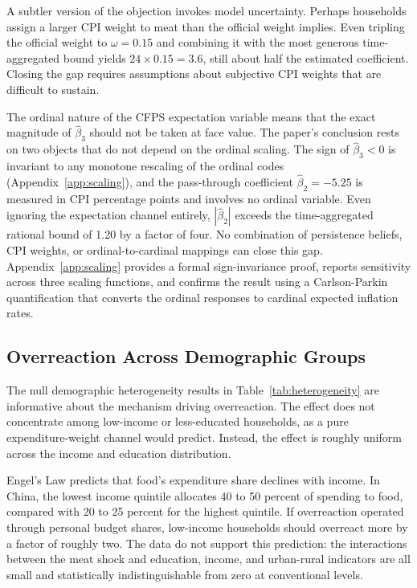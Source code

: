 A subtler version of the objection invokes model uncertainty.
Perhaps households assign a larger CPI weight to meat than the
official weight implies.
Even tripling the official weight to $\omega = 0.15$ and
combining it with the most generous time-aggregated bound
yields $24 \times 0.15 = 3.6$, still about half the
estimated coefficient.
Closing the gap requires assumptions about subjective CPI
weights that are difficult to sustain.

The ordinal nature of the CFPS expectation variable means
that the exact magnitude of $\hat{\beta}_3$ should not be
taken at face value.
The paper's conclusion rests on two objects that do not depend
on the ordinal scaling.
The sign of $\hat{\beta}_3 < 0$ is invariant to any monotone
rescaling of the ordinal codes (Appendix~\ref{app:scaling}),
and the pass-through coefficient $\hat{\beta}_2 = -5.25$
is measured in CPI percentage points and involves no ordinal
variable.
Even ignoring the expectation channel entirely,
$|\hat{\beta}_2|$ exceeds the time-aggregated rational bound
of 1.20 by a factor of four.
No combination of persistence beliefs, CPI weights, or
ordinal-to-cardinal mappings can close this gap.
Appendix~\ref{app:scaling} provides a formal sign-invariance
proof, reports sensitivity across three scaling functions,
and confirms the result using a Carlson-Parkin quantification
that converts the ordinal responses to cardinal expected
inflation rates.

\subsection{Overreaction Across Demographic Groups}\label{sec:broadbased}

The null demographic heterogeneity results in
Table~\ref{tab:heterogeneity} are informative about the
mechanism driving overreaction.
The effect does not concentrate among low-income or
less-educated households, as a pure expenditure-weight channel
would predict.
Instead, the effect is roughly uniform across the income and
education distribution.

Engel's Law predicts that food's expenditure share declines
with income.
In China, the lowest income quintile allocates 40 to 50 percent
of spending to food, compared with 20 to 25 percent for the
highest quintile.
If overreaction operated through personal budget shares,
low-income households should overreact more by a factor of
roughly two.
The data do not support this prediction: the interactions
between the meat shock and education, income, and urban-rural
indicators are all small and statistically indistinguishable
from zero at conventional levels.

